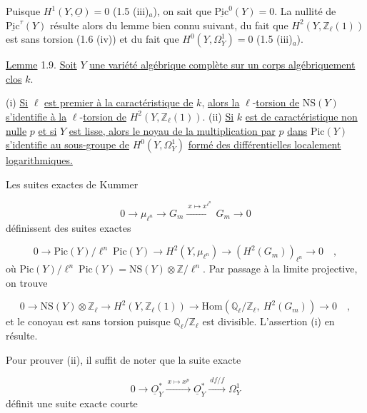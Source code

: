 Puisque $H^1(Y,\underline{O}) = 0$ (1.5 (iii)$_a$), on sait que $\underline{\mathrm{Pic}}^0(Y) = 0$. La nullité de $\underline{\mathrm{Pic}}^\tau(Y)$ résulte alors du lemme bien connu suivant, du fait que $H^2(Y, \mathbb{Z}_\ell(1))$ est sans torsion (1.6 (iv)) et du fait que $H^0(Y,\Omega^1_Y) = 0$ (1.5 (iii)$_a$).

\underline{Lemme} 1.9. \underline{Soit} $Y$ \underline{une variété algébrique complète sur un corps algébriquement clos} $k$.

(i) \underline{Si} $\ell$ \underline{est premier à la caractéristique de} $k$, \underline{alors la} $\ell$-\underline{torsion de} $\mathrm{NS}(Y)$ \underline{s'identifie à la} $\ell$-\underline{torsion de} $H^2(Y, \mathbb{Z}_\ell(1))$.
(ii) \underline{Si} $k$ \underline{est de caractéristique non nulle} $p$ \underline{et si} $Y$ \underline{est lisse, alors le noyau de la multiplication par} $p$ \underline{dans} $\mathrm{Pic}(Y)$ \underline{s'identifie au sous-groupe de} $H^0(Y,\Omega^1_Y)$ \underline{formé des différentielles localement logarithmiques.}

Les suites exactes de Kummer

\begin{equation*}
0 \longrightarrow \mu_{\ell^n} \longrightarrow G_m \xrightarrow{\ x \mapsto x^{\ell^n}\ } G_m \longrightarrow 0
\end{equation*}
définissent des suites exactes

\begin{equation*}
0 \longrightarrow \mathrm{Pic}(Y)/\ell^n\ \mathrm{Pic}(Y) \longrightarrow H^2(Y,\mu_{\ell^n}) \longrightarrow (H^2(G_m))_{\ell^n} \longrightarrow 0 \quad ,
\end{equation*}
où $\mathrm{Pic}(Y)/\ell^n\ \mathrm{Pic}(Y) = \mathrm{NS}(Y) \otimes \mathbb{Z}/\ell^n$. Par passage à la limite projective, on trouve

\begin{equation*}
0 \longrightarrow \mathrm{NS}(Y) \otimes \mathbb{Z}_\ell \longrightarrow H^2(Y, \mathbb{Z}_\ell(1)) \longrightarrow \mathrm{Hom}(\mathbb{Q}_\ell / \mathbb{Z}_\ell,\ H^2(G_m)) \longrightarrow 0 \quad ,
\end{equation*}
et le conoyau est sans torsion puisque $\mathbb{Q}_\ell / \mathbb{Z}_\ell$ est divisible. L'assertion (i) en résulte.

Pour prouver (ii), il suffit de noter que la suite exacte

\begin{equation*}
0 \longrightarrow \underline{O}^*_Y \xrightarrow{\ x \longmapsto x^p\ } \underline{O}^*_Y \xrightarrow{\ df/f\ } \Omega^1_Y
\end{equation*}
définit une suite exacte courte

